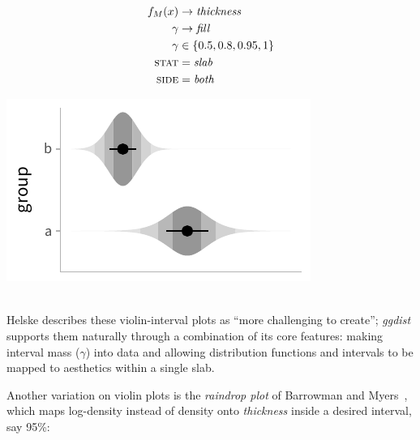 \documentclass[journal]{vgtc}                     %
\newcommand{\equationfigure}[2]{%
\noindent
\begin{minipage}{.5\columnwidth}
\setlength{\abovedisplayskip}{0pt}
\setlength{\belowdisplayskip}{0pt}
#1\end{minipage}%
\begin{minipage}{.4\columnwidth}\centering #2 \end{minipage}%
\vspace{.5\belowdisplayskip}\\
}
\begin{document}
\equationfigure{
\begin{align*}
f_M(x) &\rightarrow \textit{thickness}\\
\gamma &\rightarrow \textit{fill}\\
\gamma &\in \{0.5, 0.8, 0.95, 1\}\\
\textsc{stat} &= \mathit{slab}\\
\textsc{side} &= \mathit{both}
\end{align*}
}{\includegraphics[width=1.2\columnwidth]{figs/3-slab_violin_interval.pdf}}
Helske describes these violin-interval plots as ``more challenging to create''; \textit{ggdist} supports them naturally through a combination of its core features: making interval mass ($\gamma$) into data and allowing distribution functions and intervals to be mapped to aesthetics within a single slab.

Another variation on violin plots is the \textit{raindrop plot} of Barrowman and Myers~\cite{barrowman2003raindrop}, which maps log-density instead of density onto \textit{thickness} inside a desired interval, say 95\%:
\end{document}
